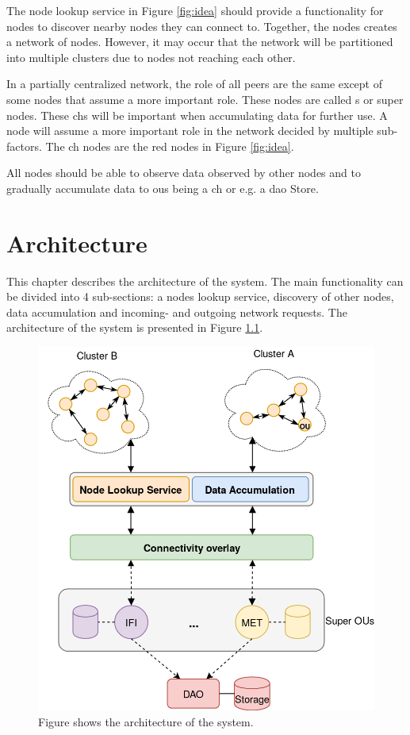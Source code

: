 \documentclass[USenglish]{uit-thesis}
\begin{document}
The node lookup service in Figure \ref{fig:idea} should provide a functionality for nodes to discover nearby nodes they can connect to. Together, the nodes creates a network of nodes. However, it may occur that the network will be partitioned into multiple clusters due to nodes not reaching each other.

In a partially centralized network, the role of all peers are the same except of some nodes that assume a more important role. These nodes are called s or super nodes. These \gls{ch}s will be important when accumulating data for further use. A node will assume a more important role in the network decided by multiple sub-factors. The \gls{ch} nodes are the red nodes in Figure \ref{fig:idea}.

All nodes should be able to observe data observed by other nodes and to gradually accumulate data to \gls{ou}s being a \gls{ch} or e.g. a \gls{dao} Store.





\chapter{Architecture}

This chapter describes the architecture of the system. The main functionality can be divided into 4 sub-sections: a nodes lookup service, discovery of other nodes, data accumulation and incoming- and outgoing network requests. The architecture of the system is presented in Figure \ref{fig:architecture3}.


\begin{figure}
\centering
\includegraphics[width=\textwidth]{arch3.png}
\caption{Figure shows the architecture of the system.}
\label{fig:architecture3}
\end{figure}
\end{document}
